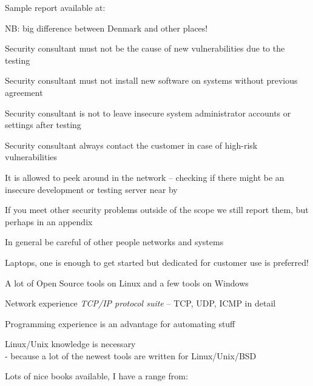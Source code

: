 \documentclass[Screen16to9,17pt]{foils}
\begin{document}
Sample report available at: 


\begin{list2}
\item NB: big difference between Denmark and other places!
\item Security consultant must not be the cause of new vulnerabilities due to the testing
\item Security consultant must not install new software on systems without previous agreement
\item Security consultant is not to leave insecure system administrator accounts or settings after testing
\item Security consultant always contact the customer in case of high-risk vulnerabilities
\item It is allowed to peek around in the network -- checking if there might be an insecure development or testing server near by
\item If you meet other security problems outside of the scope we still report them, but perhaps in an appendix
\end{list2}

\centerline{In general be careful of other people networks and systems}




\begin{list1}

\item Laptops, one is enough to get started but dedicated for customer use is preferred!
\begin{list2}
\item A lot of Open Source tools on Linux and a few tools on Windows
\item Network experience \emph{TCP/IP protocol suite} -- TCP, UDP, ICMP in detail
\item Programming experience is an advantage for automating stuff
\item Linux/Unix knowledge is necessary \\
- because a lot of the newest tools are written for Linux/Unix/BSD
\item Lots of nice books available, I have a range from:

\end{list2}
\end{list1}
\end{document}
